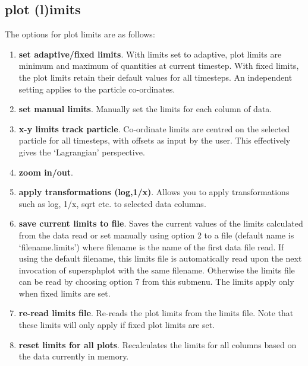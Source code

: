 \documentclass[a4paper,12pt]{article}
\begin{document}
\subsection{plot (l)imits}
\label{sec:optionslimits}
 The options for plot limits are as follows:
\begin{enumerate}
\item \textbf{set adaptive/fixed limits}. With limits set to adaptive, plot
limits are minimum and maximum of quantities at current
timestep. With fixed limits, the plot limits retain their default values
for all timesteps. An independent setting applies to the particle co-ordinates.
\item \textbf{set manual limits}. Manually set the limits for each column of
data.
\item \textbf{x-y limits track particle}. Co-ordinate limits are centred on the
selected particle for all timesteps, with offsets as input by the user. This
effectively gives the `Lagrangian' perspective.
\item \textbf{zoom in/out}.
\item \textbf{apply transformations (log,1/x)}. Allows you to apply transformations such as log, 1/x, sqrt
etc. to selected data columns.
\item \textbf{save current limits to file}. Saves the current values of the
limits calculated from the data read or set manually using option 2 to a
file (default name is `filename.limits') where filename is the name of the first data file
read. If using the default filename, this limits file is automatically read upon the next
invocation of supersphplot with the same filename.
Otherwise the limits file can be read by choosing option 7 from this submenu. The limits apply
only when fixed limits are set.
\item \textbf{re-read limits file}. Re-reads the plot limits from the
limits file. Note that these limits will only apply if fixed plot limits are set.
\item \textbf{reset limits for all plots}. Recalculates the limits for all columns based on
the data currently in memory.
\end{enumerate}
\end{document}
